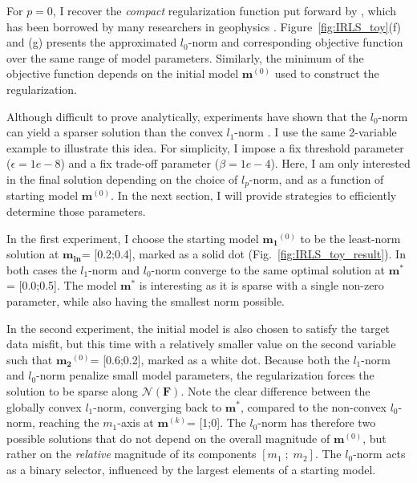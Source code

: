 For $p = 0$, I recover the \textit{compact} regularization function put forward by \cite{ LastKubik83}, which has been borrowed by many researchers in geophysics \cite{BarbosaSilva94, Ajo-Franklin07, Stocco09}.
Figure~\ref{fig:IRLS_toy}(f) and (g) presents the approximated $l_0$-norm and corresponding objective function over the same range of model parameters. 
Similarly, the minimum of the objective function depends on the initial model $\mathbf{m}^{(0)}$ used to construct the regularization.

Although difficult to prove analytically, experiments have shown that the $l_0$-norm can yield a sparser solution than the convex $l_1$-norm \cite[]{Chartrand07}. 
I use the same 2-variable example to illustrate this idea.
For simplicity, I impose a fix threshold parameter ($\epsilon = 1e-8$) and a fix trade-off parameter ($\beta=1e-4$).
Here, I am only interested in the final solution depending on the choice of $l_p$-norm, and as a function of starting model $\mathbf{m}^{(0)}$. 
In the next section, I will provide strategies to efficiently determine those parameters.

In the first experiment, I choose the starting model $\mathbf{m_1}^{(0)}$ to be the least-norm solution at $\mathbf{m_{ln}}$= [0.2;0.4], marked as a solid dot (Fig.~\ref{fig:IRLS_toy_result}). 
In both cases the $l_1$-norm and $l_0$-norm converge to the same optimal solution at $\mathbf{m^{*}}$= [0.0;0.5].
The model $\mathbf{m^{*}}$ is interesting as it is sparse with a single non-zero parameter, while also having the smallest norm possible.

In the second experiment, the initial model is also chosen to satisfy the target data misfit, but this time with a relatively smaller value on the second variable such that $\mathbf{m_2}^{(0)}$= [0.6;0.2], marked as a white dot. 
Because both the $l_1$-norm and $l_0$-norm penalize small model parameters, the regularization forces the solution to be sparse along $\mathcal{N} (\mathbf{F})$. 
Note the clear difference between the globally convex $l_1$-norm, converging back to $\mathbf{m^{*}}$, compared to the non-convex $l_0$-norm, reaching the $m_1$-axis at $\mathbf{m}^{(k)}$= [1;0]. 
The $l_0$-norm has therefore two possible solutions that do not depend on the overall magnitude of $\mathbf{m}^{(0)}$, but rather on the \emph{relative} magnitude of its components $[m_1\;;\;m_2]$. 
The $l_0$-norm acts as a binary selector, influenced by the largest elements of a starting model.

